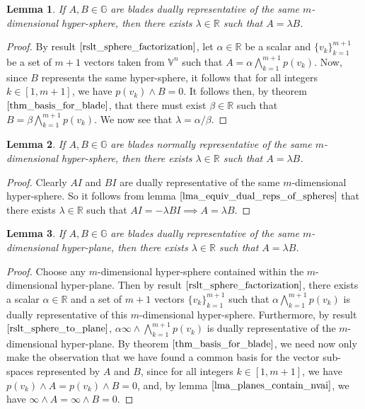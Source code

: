 \documentclass{article}
\newcommand{\R}{\mathbb{R}}
\newcommand{\V}{\mathbb{V}}
\newcommand{\G}{\mathbb{G}}
\newcommand{\nvai}{\infty}
\newtheorem{lemma}{Lemma}[section]
\begin{document}
\begin{lemma}\label{lma_equiv_dual_reps_of_spheres}
If $A,B\in\G$ are blades dually representative of the same $m$-dimensional hyper-sphere,
then there exists $\lambda\in\R$ such that $A=\lambda B$.
\end{lemma}
\begin{proof}
By result $\eqref{rslt_sphere_factorization}$, let $\alpha\in\R$ be a scalar
and $\{v_k\}_{k=1}^{m+1}$ be a set of $m+1$ vectors taken from $\V^n$ such that
$A=\alpha\bigwedge_{k=1}^{m+1}p(v_k)$.  Now, since $B$ represents the same
hyper-sphere, it follows that for all integers $k\in[1,m+1]$, we
have $p(v_k)\wedge B=0$.  It follows then, by theorem $\eqref{thm_basis_for_blade}$, that
there must exist $\beta\in\R$ such that $B=\beta\bigwedge_{k=1}^{m+1}p(v_k)$.
We now see that $\lambda=\alpha/\beta$.
\end{proof}

\begin{lemma}\label{lma_equiv_norm_reps_of_spheres}
If $A,B\in\G$ are blades normally representative of the same $m$-dimensional hyper-sphere,
then there exists $\lambda\in\R$ such that $A=\lambda B$.
\end{lemma}
\begin{proof}
Clearly $AI$ and $BI$ are dually representative of the same $m$-dimensional hyper-sphere.
So it follows from lemma $\eqref{lma_equiv_dual_reps_of_spheres}$ that there exists $\lambda\in\R$
such that $AI=-\lambda BI\implies A=\lambda B$.
\end{proof}

\begin{lemma}\label{lma_equiv_dual_reps_of_planes}
If $A,B\in\G$ are blades dually representative of the same $m$-dimensional hyper-plane,
then there exists $\lambda\in\R$ such that $A=\lambda B$.
\end{lemma}
\begin{proof}
Choose any $m$-dimensional hyper-sphere contained within the $m$-dimensional hyper-plane.
Then by result $\eqref{rslt_sphere_factorization}$, there exists a scalar $\alpha\in\R$
and a set of $m+1$ vectors $\{v_k\}_{k=1}^{m+1}$ such that $\alpha\bigwedge_{k=1}^{m+1}p(v_k)$
is dually representative of this $m$-dimensional hyper-sphere.  Furthermore, by
result $\eqref{rslt_sphere_to_plane}$, $\alpha\nvai\wedge\bigwedge_{k=1}^{m+1}p(v_k)$ is dually representative
of the $m$-dimensional hyper-plane.  By theorem $\eqref{thm_basis_for_blade}$, we need now only
make the observation that we have
found a common basis for the vector sub-spaces represented by $A$ and $B$, since
for all integers $k\in[1,m+1]$, we have $p(v_k)\wedge A=p(v_k)\wedge B=0$, and, by lemma $\eqref{lma_planes_contain_nvai}$,
we have $\nvai\wedge A=\nvai\wedge B=0$.
\end{proof}
\end{document}
